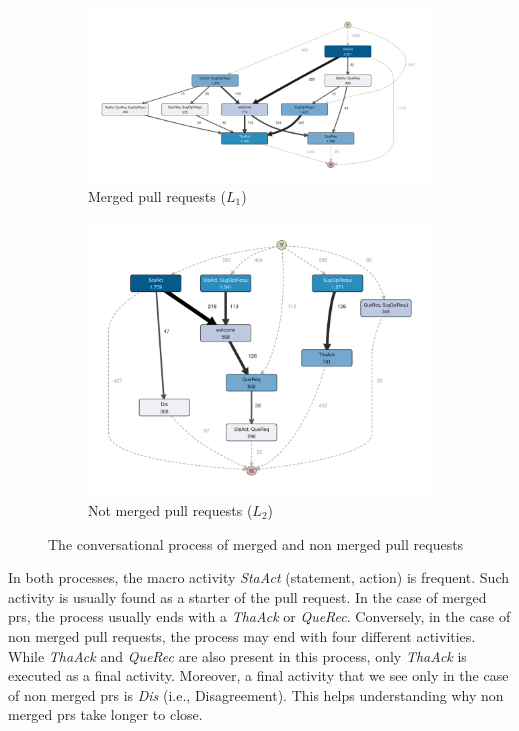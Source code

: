 \begin{figure}[h]
	\centering
	\begin{subfigure}[b]{\linewidth}
		\includegraphics[width=.98\linewidth]{figures/merged-a25-p0}
		\caption{Merged pull requests ($L_1$)}
	\end{subfigure}
%
	\begin{subfigure}[b]{\linewidth}
		\includegraphics[width=.98\linewidth]{figures/not-merged-a25-p0}
		\caption{Not merged pull requests ($L_2$)}
	\end{subfigure}
	\caption{The conversational process of merged and non merged pull requests}
	\label{fig:speechActProcess}
\end{figure}

In both processes, the macro activity \emph{StaAct} (statement, action) is frequent. Such activity is usually found as a starter of the pull request. In the case of merged \glspl{pr}, the process usually ends with a \emph{ThaAck} or \emph{QueRec}. Conversely, in the case of non merged pull requests, the process may end with four different activities. While \emph{ThaAck} and \emph{QueRec} are also present in this process, only \emph{ThaAck} is executed as a final activity. Moreover, a final activity that we see only in the case of non merged \glspl{pr} is \emph{Dis} (i.e., 
Disagreement). This helps understanding why non merged \glspl{pr} take longer to close. 

